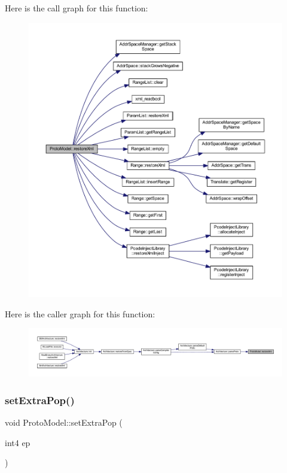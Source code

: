 Here is the call graph for this function\+:
\nopagebreak
\begin{figure}[H]
\begin{center}
\leavevmode
\includegraphics[width=350pt]{class_proto_model_a8fe30abbc7fe1c709b1b8fe9c81803b8_cgraph}
\end{center}
\end{figure}
Here is the caller graph for this function\+:
\nopagebreak
\begin{figure}[H]
\begin{center}
\leavevmode
\includegraphics[width=350pt]{class_proto_model_a8fe30abbc7fe1c709b1b8fe9c81803b8_icgraph}
\end{center}
\end{figure}
\mbox{\label{class_proto_model_a42eb0adf6bb66f15bbbde19c02c931ca}} 
\subsubsection{\texorpdfstring{setExtraPop()}{setExtraPop()}}
{\footnotesize\ttfamily void Proto\+Model\+::set\+Extra\+Pop (\begin{DoxyParamCaption}\item[{int4}]{ep }\end{DoxyParamCaption})\hspace{0.3cm}{\ttfamily [inline]}}



